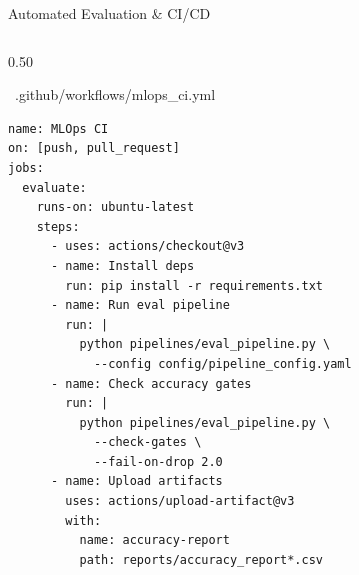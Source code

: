 \documentclass[aspectratio=169,12pt]{beamer}
\begin{document}
\begin{frame}{Automated Evaluation \& CI/CD}
\begin{columns}[T]
    \begin{column}{0.50\textwidth}
      \begin{block}{\faCodeBranch~.github/workflows/mlops\_ci.yml}
        \begin{lstlisting}
name: MLOps CI
on: [push, pull_request]
jobs:
  evaluate:
    runs-on: ubuntu-latest
    steps:
      - uses: actions/checkout@v3
      - name: Install deps
        run: pip install -r requirements.txt
      - name: Run eval pipeline
        run: |
          python pipelines/eval_pipeline.py \
            --config config/pipeline_config.yaml
      - name: Check accuracy gates
        run: |
          python pipelines/eval_pipeline.py \
            --check-gates \
            --fail-on-drop 2.0
      - name: Upload artifacts
        uses: actions/upload-artifact@v3
        with:
          name: accuracy-report
          path: reports/accuracy_report*.csv
        \end{lstlisting}
      \end{block}
    \end{column}
  \end{columns}
\end{frame}
\end{document}
